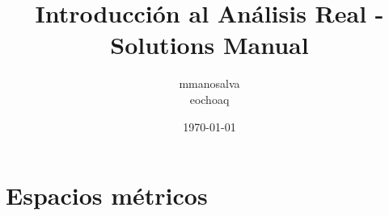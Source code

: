\documentclass[12pt,a4paper]{report}
\title{Introducción al Análisis Real - Solutions Manual}
\author{mmanosalva\\
eochoaq}
\date{\today}
\begin{document}
\maketitle
\tableofcontents
\cleardoublepage

\chapter{Espacios métricos}

\end{document}
